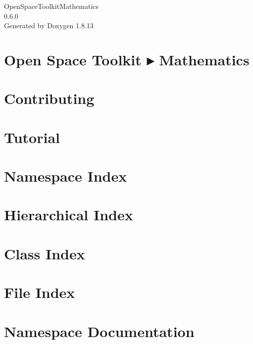 \documentclass[twoside]{book}
\newcommand{\+}{\discretionary{\mbox{\scriptsize$\hookleftarrow$}}{}{}}
\newcommand{\clearemptydoublepage}{%
  \newpage{\pagestyle{empty}\cleardoublepage}%
}
\begin{document}
\hypersetup{pageanchor=false,
             bookmarksnumbered=true,
             pdfencoding=unicode
            }
\begin{titlepage}
\vspace*{7cm}
\begin{center}%
{\Large Open\+Space\+Toolkit\+Mathematics \\[1ex]\large 0.\+6.\+0 }\\
\vspace*{1cm}
{\large Generated by Doxygen 1.8.13}\\
\end{center}
\end{titlepage}
\clearemptydoublepage
{}
\tableofcontents
\clearemptydoublepage
{}
\hypersetup{pageanchor=true}

\chapter{Open Space Toolkit ▸ Mathematics}
\label{index}\hypertarget{index}{}
\chapter{Contributing}
\label{md__c_o_n_t_r_i_b_u_t_i_n_g}

\chapter{Tutorial}
\label{md_docs__tutorial}

\chapter{Namespace Index}

\chapter{Hierarchical Index}

\chapter{Class Index}

\chapter{File Index}

\chapter{Namespace Documentation}










\end{document}
